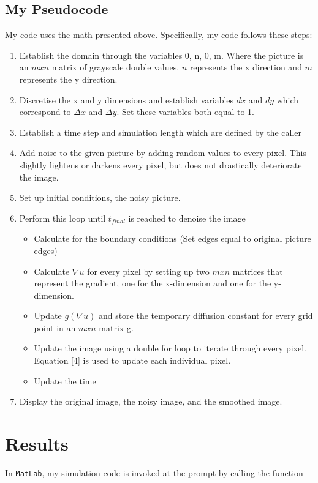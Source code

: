 \documentclass[12pt]{article}
\begin{document}
\subsection{My Pseudocode}
My code uses the math presented above. Specifically, my code follows these steps:
\begin{enumerate}

\item Establish the domain through the variables 0, n, 0, m. Where the picture is an $mxn$ matrix of grayscale double values. $n$ represents the x direction and $m$ represents the y direction.
\item Discretise the x and y dimensions and establish variables $dx$ and $dy$ which correspond to $\Delta x$ and $\Delta y$. Set these variables both equal to 1.
\item Establish a time step and simulation length which are defined by the caller
\item Add noise to the given picture by adding random values to every pixel. This slightly lightens or darkens every pixel, but does not drastically deteriorate the image.
\item Set up initial conditions, the noisy picture.
\item Perform this loop until $t_{final}$ is reached to denoise the image
	\begin{itemize}
	\item Calculate for the boundary conditions (Set edges equal to original picture edges)
	\item Calculate $\nabla u$ for every pixel by setting up two $mxn$ matrices that represent the gradient, one for the x-dimension and one for the y-dimension.
	\item Update $g(\nabla u)$ and store the temporary diffusion constant for every grid point in an $mxn$ matrix g.
	\item Update the image using a double for loop to iterate through every pixel. Equation [4] is used to update each individual pixel.
	\item Update the time
	\end{itemize}
\item Display the original image, the noisy image, and the smoothed image.
\end{enumerate}

\section{Results}\label{sec::results}
In \texttt{MatLab}, my simulation code is invoked at the prompt by calling the function 
\end{document}

